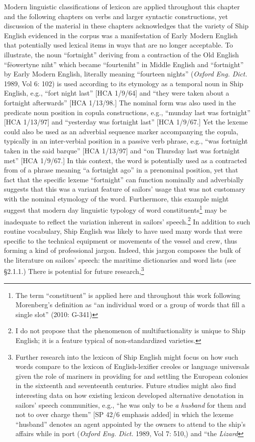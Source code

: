 \documentclass[12pt]{article}
\newenvironment{styleStandard}{\renewcommand\baselinestretch{1.0}\setlength\leftskip{0cm}\setlength\rightskip{0cm plus 1fil}\setlength\parindent{0cm}\setlength\parfillskip{0pt plus 1fil}\setlength\parskip{0in plus 1pt}\writerlistparindent\writerlistleftskip\leavevmode\normalfont\normalsize\writerlistlabel\ignorespaces}{\unskip\vspace{0in plus 1pt}\par}
\newcommand\writerlistleftskip{}
\newcommand\writerlistparindent{}
\newcommand\writerlistlabel{}
\begin{document}
\begin{styleStandard}
Modern linguistic classifications of lexicon are applied throughout this chapter and the following chapters on verbs and larger syntactic constructions, yet discussion of the material in these chapters acknowledges that the variety of Ship English evidenced in the corpus was a manifestation of Early Modern English that potentially used lexical items in ways that are no longer acceptable. To illustrate, the noun “fortnight” deriving from a contraction of the Old English “f\=eowertyne niht” which became “fourteniht” in Middle English and “fortnight” by Early Modern English, literally meaning “fourteen nights” (\textit{Oxford Eng. Dict. }1989, Vol 6: 102) is used according to its etymology as a temporal noun in Ship English, e.g., “fort night last” [HCA 1/9/64] and “they were taken about a fortnight afterwards” [HCA 1/13/98.] The nominal form was also used in the predicate noun position in copula constructions, e.g., “munday last was fortnight” [HCA 1/13/97] and “yesterday was fortnight last” [HCA 1/9/67.] Yet the lexeme could also be used as an adverbial sequence marker accompanying the copula, typically in an inter-verbial position in a passive verb phrase, e.g., “was fortnight taken in the said barque” [HCA 1/13/97] and “on Thursday last was fortnight met” [HCA 1/9/67.] In this context, the word is potentially used as a contracted from of a phrase meaning “a fortnight ago” in a prenominal position, yet that fact that the specific lexeme “fortnight” can function nominally and adverbially suggests that this was a variant feature of sailors’ usage that was not customary with the nominal etymology of the word. Furthermore, this example might suggest that modern day linguistic typology of word constituents\footnote{ The term “constituent” is applied here and throughout this work following Morenberg’s definition as “an individual word or a group of words that fill a single slot” (2010: G-341)} may be inadequate to reflect the variation inherent in sailors’ speech.\footnote{ I do not propose that the phenomenon of multifuctionality is unique to Ship English; it is a feature typical of non-standardized varieties.} In addition to such routine vocabulary, Ship English was likely to have used many words that were specific to the technical equipment or movements of the vessel and crew, thus forming a kind of professional jargon. Indeed, this jargon composes the bulk of the literature on sailors’ speech: the maritime dictionaries and word lists (see §2.1.1.) There is potential for future research,\footnote{ Further research into the lexicon of Ship English might focus on how such words compare to the lexicon of English-lexifier creoles or language universals given the role of mariners in providing for and settling the European colonies in the sixteenth and seventeenth centuries. Future studies might also find interesting data on how existing lexicon developed alternative denotation in sailors’ speech communities, e.g., “he was only to be \textit{a husband} for them and not to over charge them” [SP 42/6 emphasis added] in which the lexeme “husband” denotes an agent appointed by the owners to attend to the ship’s affairs while in port (\textit{Oxford Eng. Dict. }1989, Vol 7: 510,) and “the\textit{ Lizard} 
\end{styleStandard}
\end{document}
